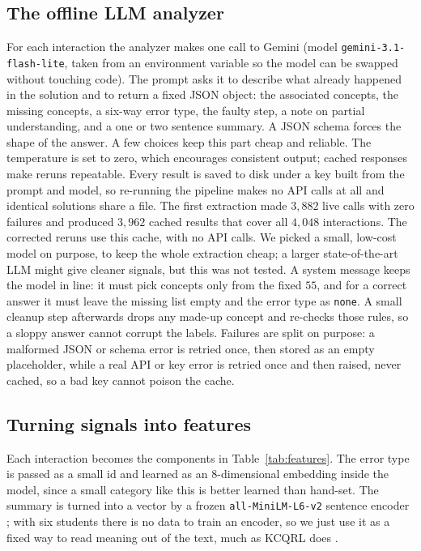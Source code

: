 \documentclass[11pt]{article}
\newcommand{\code}[1]{\texttt{\small #1}}
\begin{document}
\subsection{The offline LLM analyzer}
For each interaction the analyzer makes one call to Gemini (model
\code{gemini-3.1-flash-lite}, taken from an environment variable so the model can be
swapped without touching code). The prompt asks it to describe what already happened
in the solution and to return a fixed JSON object: the associated concepts, the
missing concepts, a six-way error type, the faulty step, a note on partial
understanding, and a one or two sentence summary. A JSON schema forces the shape of
the answer. A few choices keep this part cheap and reliable. The temperature is set to
zero, which encourages consistent output; cached responses make reruns repeatable. Every result is saved to disk
under a key built from the prompt and model, so re-running the pipeline makes no API
calls at all and identical solutions share a file. The first extraction made
$3{,}882$ live calls with zero failures and produced $3{,}962$ cached results that
cover all $4{,}048$ interactions. The corrected reruns use this cache, with no API calls. We picked a small, low-cost model
on purpose, to keep the whole extraction cheap; a larger state-of-the-art LLM might give cleaner signals, but this was not tested. A system message keeps the model
in line: it must pick concepts only from the fixed $55$, and for a correct answer it
must leave the missing list empty and the error type as \code{none}. A small
cleanup step afterwards drops any made-up concept and re-checks those rules, so a
sloppy answer cannot corrupt the labels. Failures are split on purpose: a malformed
JSON or schema error is retried once, then stored as an empty placeholder, while a real API or
key error is retried once and then raised, never cached, so a bad key cannot poison the
cache.

\subsection{Turning signals into features}
Each interaction becomes the components in Table~\ref{tab:features}. The error type is
passed as a small id and learned as an $8$-dimensional embedding inside the model,
since a small category like this is better learned than hand-set. The summary is
turned into a vector by a frozen \code{all-MiniLM-L6-v2} sentence encoder
\cite{reimers2019sbert}; with six students there is no data to train an encoder, so we
just use it as a fixed way to read meaning out of the text, much as KCQRL does
\cite{ozyurt2024kcqrl}.
\end{document}
